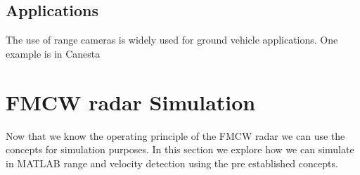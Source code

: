 \subsection{Applications}
The use of range cameras is widely used for ground vehicle applications. One example is in Canesta







\section{FMCW radar Simulation}
Now that we know the operating principle of the \ac{FMCW} \ac{radar} we can use the concepts for simulation purposes. In this section we explore how we can simulate in MATLAB range and velocity detection using the pre established concepts. 
